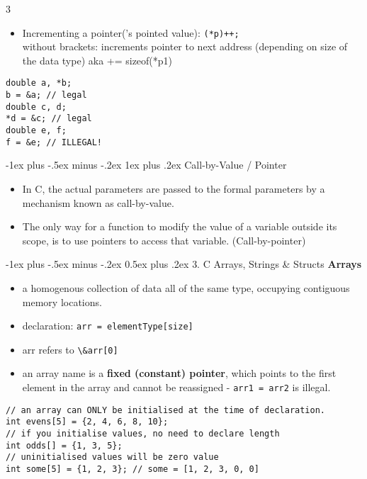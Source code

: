 \documentclass[12pt, landscape]{article}
\makeatletter
\newcommand{\code}[1]{\colorbox{gray!25!}{\lstinline[basicstyle=\scriptsize]|#1|}}
\renewcommand{\section}{\@startsection{section}{1}{0mm}%
                                {-1ex plus -.5ex minus -.2ex}%
                                {0.5ex plus .2ex}%
                                {\normalfont\large\bfseries}}
\renewcommand{\subsubsection}{\@startsection{subsubsection}{3}{0mm}%
                                {-1ex plus -.5ex minus -.2ex}%
                                {1ex plus .2ex}%
                                {\normalfont\small\bfseries}}
\makeatother
\begin{document}
\begin{multicols*}{3}
\begin{itemize}
	\item Incrementing a pointer('s pointed value): \code{(*p)++;} \\
without brackets: increments pointer to next address (depending
on size of the data type) aka += sizeof(*p1)
	
\end{itemize}
\begin{lstlisting}
double a, *b;
b = &a; // legal
double c, d;
*d = &c; // legal
double e, f;
f = &e; // ILLEGAL!
\end{lstlisting}

\subsubsection{Call-by-Value / Pointer}
\begin{itemize}
	\item In C, the actual parameters are passed to the formal parameters by a mechanism known as call-by-value. 
	\item The only way for a function to modify the value of a variable outside its scope, is to use pointers to access that variable. (Call-by-pointer)

\end{itemize}

\vfill\null
\columnbreak

\section{3. C Arrays, Strings \& Structs}
\textbf{Arrays}
\begin{itemize}
	\item a homogenous collection of data all of the same type, occupying contiguous memory locations.
	\item  declaration: \code{arr = elementType[size]}
	\item arr refers to \code{\&arr[0]}
	\item an array name is a \textbf{fixed (constant) pointer}, which points to the first element in the array and cannot be reassigned - \code{arr1 = arr2} is illegal.
\end{itemize}
\begin{lstlisting}
// an array can ONLY be initialised at the time of declaration.
int evens[5] = {2, 4, 6, 8, 10};
// if you initialise values, no need to declare length
int odds[] = {1, 3, 5};
// uninitialised values will be zero value
int some[5] = {1, 2, 3}; // some = [1, 2, 3, 0, 0]


\end{lstlisting}
\end{multicols*}
\end{document}

